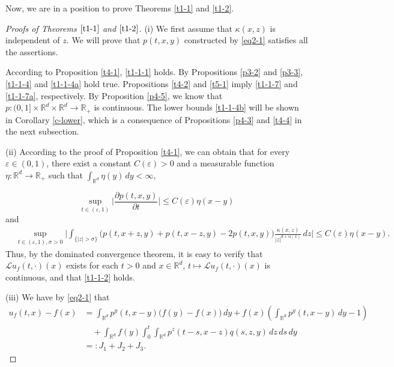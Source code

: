 \documentclass[a4paper,11pt]{amsart}
\renewcommand{\le}{\leqslant}
\newcommand{\R}{\mathds R}
\newcommand{\K}{\kappa}
\newcommand{\A}{\alpha}
\newcommand{\e}{ \varepsilon}
\def\LL{{\mathcal L}}
\theoremstyle{definition}
\begin{document}
Now, we are in a position to prove Theorems \ref{t1-1} and \ref{t1-2}.
\begin{proof}[Proofs of Theorems $\ref{t1-1}$ and $\ref{t1-2}$]
(i) We first assume that $\K(x,z)$ is independent of $z$.
We will prove that $p(t,x,y)$ constructed by \eqref{eq2-1} satisfies all the assertions.

According to Proposition \ref{t4-1}, \eqref{t1-1-1} holds. By
Propositions \ref{p3-2} and \ref{p3-3}, \eqref{t1-1-4} and \eqref{t1-1-4a} hold true.
Propositions \ref{t4-2} and \ref{t5-1} imply
\eqref{t1-1-7} and \eqref{t1-1-7a}, respectively. By Proposition \ref{p4-5},  we know that
$p:(0,1]\times\R^d\times \R^d\rightarrow \R_+$ is continuous. The lower bounds
\eqref{t1-1-4b}  will be shown in Corollary \ref{c-lower}, which is a consequence of Propositions
\ref{p4-3} and \ref{t4-4} in the next subsection.

\smallskip

(ii) According to  the proof of Proposition \ref{t4-1}, we can
obtain that for every $\e \in (0,1)$, there exist a constant
$C(\e)>0$ and a measurable function $\eta:\R^d \to  \R_+$ such that
$\int_{\R^d}\eta(y)\,dy<\infty$,

\begin{equation*}
\sup_{t \in (\e,1)}\Big|\frac{\partial p(t,x,y)}{\partial t}\Big|\le C(\e)\eta(x-y)
\end{equation*} and
\begin{equation*}\begin{split}
&\sup_{t \in (\e,1),\sigma>0}\bigg|\int_{\{|z|>\sigma\}}\big(p(t,x+z,y)+p(t,x-z,y)-2p(t,x,y)\big)
\frac{\K(x,z)}{|z|^{d+\A(x)}}\,dz\bigg|\le C(\e)\eta(x-y).\end{split}
\end{equation*}
Thus, by the dominated convergence theorem, it is easy to verify
that $\LL u_f (t, \cdot) (x)$ exists for each $t>0$ and $x\in \R^d$, $t\mapsto \LL u_f (t, \cdot) (x)$
is continuous,  and that \eqref{t1-1-2} holds.

\smallskip

(iii) We have by \eqref{eq2-1} that
\begin{align*}
u_f(t,x)-f(x)&=\int_{\R^d}p^y(t,x-y)\big(f(y)-f(x)\big)\,dy+
f(x)\left(\int_{\R^d}p^y(t,x-y)\,dy-1\right)\\
&\quad +\int_{\R^d} f(y)\int_0^t\int_{\R^d}p^z(t-s,x-z)q(s,z,y)\,dz\,ds\,dy\\
&=:J_1+J_2+J_3.
\end{align*}


\end{proof}
\end{document}
